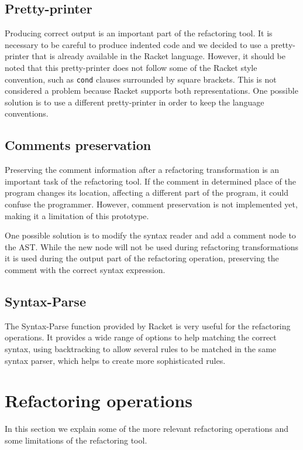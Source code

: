 \subsection{Pretty-printer}
Producing correct output is an important part of the refactoring tool.
It is necessary to be careful to produce indented code and we decided
to use a pretty-printer that is already available in the Racket
language.  However, it should be noted that this pretty-printer does
not follow some of the Racket style convention, such as {\tt cond}
clauses surrounded by square brackets. This is not considered a
problem because Racket supports both representations.  One possible
solution is to use a different pretty-printer in order to keep the
language conventions.


\subsection{Comments preservation}
Preserving the comment information after a refactoring transformation
is an important task of the refactoring tool. If the comment in
determined place of the program changes its location, affecting a
different part of the program, it could confuse the programmer.
However, comment preservation is not implemented yet, making it a
limitation of this prototype.

One possible solution is to modify the syntax reader and add a comment
node to the AST.  While the new node will not be used during
refactoring transformations it is used during the output part of the
refactoring operation, preserving the comment with the correct syntax
expression.


\subsection{Syntax-Parse}

The Syntax-Parse\cite{tobin2011languages} function provided by Racket
is very useful for the refactoring operations. It provides a wide
range of options to help matching the correct syntax,
using %
backtracking to allow several rules to be matched in the same
syntax parser, which helps to create more sophisticated rules.

\section{Refactoring operations}
In this section we explain some of the  more relevant refactoring operations and
some limitations of the refactoring tool.

